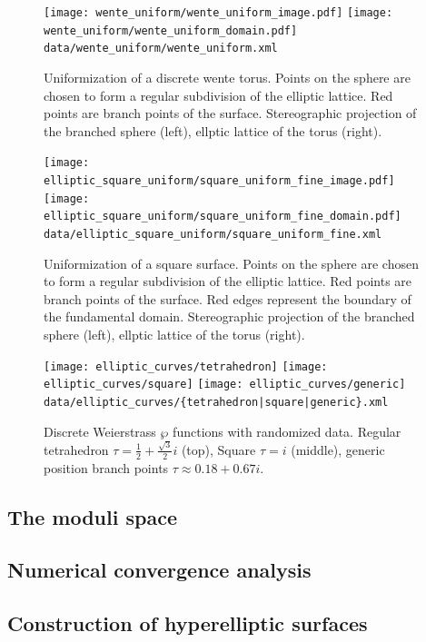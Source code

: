 \documentclass[Thesis.tex]{subfiles}
\begin{document}
\begin{figure}
	\centering
	\texttt{[image: wente\_uniform/wente\_uniform\_image.pdf]}
	\texttt{[image: wente\_uniform/wente\_uniform\_domain.pdf]}
	{\scriptsize\tt data/wente\_uniform/wente\_uniform.xml}
	\caption{Uniformization of a discrete wente torus. Points on the sphere are chosen to 
form a regular subdivision of the elliptic lattice. Red points are branch points of the surface.
Stereographic projection of the branched sphere (left), ellptic lattice of the torus (right).}
	\label{fig:wente_elliptic}
\end{figure}

\begin{figure}
	\centering
	\texttt{[image: elliptic\_square\_uniform/square\_uniform\_fine\_image.pdf]}
	\texttt{[image: elliptic\_square\_uniform/square\_uniform\_fine\_domain.pdf]}
	{\scriptsize\tt data/elliptic\_square\_uniform/square\_uniform\_fine.xml}
	\caption{Uniformization of a square surface. Points on the sphere are chosen to form a 
regular subdivision of the elliptic lattice. Red points are branch points of the surface. Red 
edges represent the boundary of the fundamental domain. Stereographic projection of the 
branched sphere (left), ellptic lattice of the torus (right).}
	\label{fig:square_elliptic}
\end{figure}	


\begin{figure}[p]
	\centering
	\texttt{[image: elliptic\_curves/tetrahedron]}
	\texttt{[image: elliptic\_curves/square]}
	\texttt{[image: elliptic\_curves/generic]}
	{\scriptsize\tt data/elliptic\_curves/\{tetrahedron|square|generic\}.xml}
	\caption{Discrete Weierstrass $\wp$ functions with randomized data. Regular tetrahedron $\tau=\frac{1}{2}+\frac{\sqrt 3}{2}i$ (top), Square $\tau=i$ (middle), generic position branch points $\tau \approx 0.18+0.67i$.}
\end{figure}

\subsection{The moduli space}
\subsection{Numerical convergence analysis}

\subsection{Construction of hyperelliptic surfaces}
\label{sec:examples_hyperelliptic}
\end{document}

